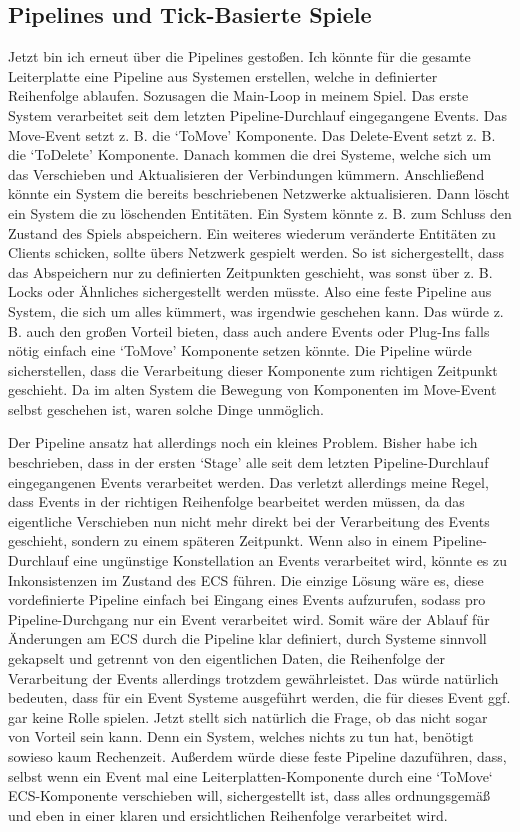 \documentclass{article}
\begin{document}
    \subsection{Pipelines und Tick-Basierte Spiele}
    Jetzt bin ich erneut über die Pipelines gestoßen.
    Ich könnte für die gesamte Leiterplatte eine Pipeline aus Systemen erstellen, welche in definierter Reihenfolge ablaufen.
    Sozusagen die Main-Loop in meinem Spiel.
    Das erste System verarbeitet seit dem letzten Pipeline-Durchlauf eingegangene Events.
    Das Move-Event setzt z. B. die `ToMove' Komponente.
    Das Delete-Event setzt z. B. die `ToDelete' Komponente.
    Danach kommen die drei Systeme, welche sich um das Verschieben und Aktualisieren der Verbindungen kümmern.
    Anschließend könnte ein System die bereits beschriebenen Netzwerke aktualisieren.
    Dann löscht ein System die zu löschenden Entitäten.
    Ein System könnte z. B. zum Schluss den Zustand des Spiels abspeichern.
    Ein weiteres wiederum veränderte Entitäten zu Clients schicken, sollte übers Netzwerk gespielt werden.
    So ist sichergestellt, dass das Abspeichern nur zu definierten Zeitpunkten geschieht, was sonst über z. B. Locks
    oder Ähnliches sichergestellt werden müsste.
    Also eine feste Pipeline aus System, die sich um alles kümmert, was irgendwie geschehen kann.
    Das würde z. B. auch den großen Vorteil bieten, dass auch andere Events oder Plug-Ins falls nötig einfach eine
    `ToMove' Komponente setzen könnte.
    Die Pipeline würde sicherstellen, dass die Verarbeitung dieser Komponente zum richtigen Zeitpunkt geschieht.
    Da im alten System die Bewegung von Komponenten im Move-Event selbst geschehen ist, waren solche Dinge unmöglich.

    Der Pipeline ansatz hat allerdings noch ein kleines Problem.
    Bisher habe ich beschrieben, dass in der ersten `Stage' alle seit dem letzten Pipeline-Durchlauf eingegangenen Events verarbeitet werden.
    Das verletzt allerdings meine Regel, dass Events in der richtigen Reihenfolge bearbeitet werden müssen, da das eigentliche Verschieben
    nun nicht mehr direkt bei der Verarbeitung des Events geschieht, sondern zu einem späteren Zeitpunkt.
    Wenn also in einem Pipeline-Durchlauf eine ungünstige Konstellation an Events verarbeitet wird, könnte es zu Inkonsistenzen im Zustand
    des ECS führen.
    Die einzige Lösung wäre es, diese vordefinierte Pipeline einfach bei Eingang eines Events aufzurufen, sodass pro Pipeline-Durchgang
    nur ein Event verarbeitet wird.
    Somit wäre der Ablauf für Änderungen am ECS durch die Pipeline klar definiert, durch Systeme sinnvoll
    gekapselt und getrennt von den eigentlichen Daten, die Reihenfolge der Verarbeitung der Events allerdings trotzdem gewährleistet.
    Das würde natürlich bedeuten, dass für ein Event Systeme ausgeführt werden, die für dieses Event ggf. gar keine Rolle spielen.
    Jetzt stellt sich natürlich die Frage, ob das nicht sogar von Vorteil sein kann.
    Denn ein System, welches nichts zu tun hat, benötigt sowieso kaum Rechenzeit.
    Außerdem würde diese feste Pipeline dazuführen, dass, selbst wenn ein Event mal eine Leiterplatten-Komponente durch
    eine `ToMove` ECS-Komponente verschieben will, sichergestellt ist, dass alles ordnungsgemäß und eben in einer klaren
    und ersichtlichen Reihenfolge verarbeitet wird.
\end{document}
